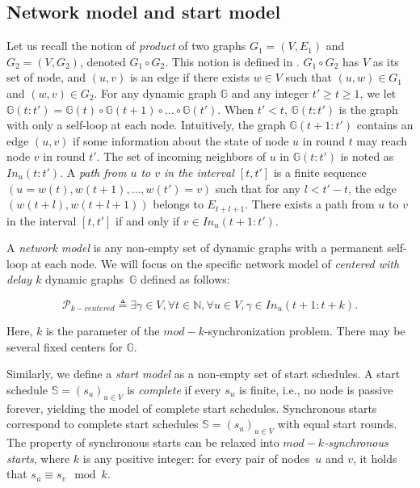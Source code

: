 \documentclass[11pt,letterpaper]{article}
\newcommand{\cent}{\gamma}
\begin{document}
\subsection{Network model and start model}

Let us recall the notion of \textit{product} of two graphs $G_1 = (V, E_1)$ and $G_2 = (V, G_2)$, denoted $G_1 \circ G_2$. This notion is defined in \cite{CBM19}.
$G_1 \circ G_2$ has $V$ as its set of node, and $(u,v)$ is an edge if there exists $w \in V$ such that $(u,w) \in G_1$ and $(w,v) \in G_2$.
For any dynamic graph $\mathds{G}$ and any integer $t' \geq t \geq 1$, we let $\mathds{G}(t:t') = \mathds{G}(t) \circ \mathds{G}(t+1) \circ \dots \circ \mathds{G}(t')$.
When $t' < t$, $\mathds{G}(t:t')$ is the graph with only a self-loop at each node.
Intuitively, the graph $\mathds{G}(t+1:t')$ contains an edge $(u,v)$ if some information about the state of node $u$ in round $t$ may reach node $v$ in round $t'$.
The set of incoming neighbors of $u$ in $\mathds{G}(t:t')$ is noted as $In_u(t:t')$.
A \textit{path from $u$ to $v$ in the interval $[t,t']$} is a finite sequence $(u = w(t), w(t+1), \dots, w(t') = v)$
such that for any $l < t'-t$, the edge $(w(t+l),w(t+l+1))$ belongs to $E_{t+l+1}$.
There exists a path from $u$ to $v$ in the interval $[t,t']$ if and only if $v \in In_u(t+1:t')$.

A \emph{network model} is any non-empty set of dynamic graphs with a permanent self-loop at each node.
We will focus on the specific network model of \emph{centered with delay $k$} dynamic graphs~$\mathds{G}$ defined as follows: 

$$\mathcal{P}_{k-centered} \triangleq \exists \cent \in V, \forall t \in \mathds{N}, \forall u \in V, \cent \in In_u(t+1:t+k).$$

Here, $k$ is the parameter of the $mod-k$-synchronization problem.
There may be several fixed centers for $\mathds{G}$.

Similarly, we define a \emph{start model} as a non-empty set of start schedules.
A start schedule $\mathds{S} = (s_u)_{u\in V}$ is \emph{complete} if every $s_u$ is finite, i.e.,
no node is passive forever, yielding the model of complete start schedules.
Synchronous starts correspond to complete start schedules $\mathds{S} = (s_u)_{u\in V}$ with
equal start rounds.	
The property of synchronous starts can be relaxed into \emph{$mod-k$-synchronous starts},
where $k$ is any positive integer: for every pair of nodes~$u$ and $v$, it holds that $s_u \equiv s_v \!\mod k$.
\end{document}
